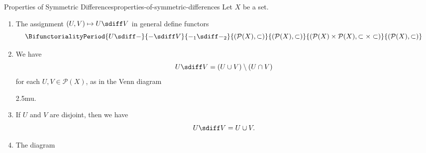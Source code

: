 \begin{proposition}{Properties of Symmetric Differences}{properties-of-symmetric-differences}%
    Let $X$ be a set.
    \begin{enumerate}
        \item\label{properties-of-symmetric-differences-lack-of-functoriality}The assignment $(U,V)\mapsto U\sdiff V$  in general define functors
            \[
                \BifunctorialityPeriod{U\sdiff-}{-\sdiff V}{-_{1}\sdiff-_{2}}{(\mathcal{P}(X),\subset)}{(\mathcal{P}(X),\subset)}{(\mathcal{P}(X)\times\mathcal{P}(X),\subset\times\subset)}{(\mathcal{P}(X),\subset)}%
            \]%
        \item\label{properties-of-symmetric-differences-via-unions-and-intersections}We have%
            \[
                U\sdiff V%
                =%
                (U\cup V)\setminus(U\cap V)%
            \]%
            for each $U,V\in\mathcal{P}(X)$, as in the Venn diagram
            \begin{webcompile}
                \hspace{0.5em}\scalebox{1.5}{$\mathbin{=}$}\hspace{0.6em}%
                \hspace{0.5em}\scalebox{1.5}{$\mathbin{\setminus}$}\hspace{0.5em}%
                \mkern2.5mu.%
            \end{webcompile}%
        \item\label{properties-of-symmetric-differences-symmetric-differences-of-disjoint-sets}If $U$ and $V$ are disjoint, then we have
            \[
                U\sdiff V%
                =%
                U\cup V.%
            \]%
        \item\label{properties-of-symmetric-differences-associativity}The diagram

\end{enumerate}
\end{proposition}
